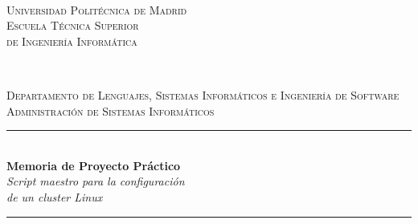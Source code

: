 \documentclass[12pt,a4paper, spanish]{article}
\begin{document}
\begin{titlepage}
  \newcommand{\HRule}{\rule{\linewidth}{0.5mm}}
  \centering

  \textsc{}\\[0.25cm]

  \textsc{\huge{Universidad Politécnica de Madrid}}\\[0.5cm]

  \textsc{\LARGE Escuela Técnica Superior\\de Ingeniería Informática}\\[0.3cm]

  \begin{figure}[H]
    \centering
    \qquad
    \\[0.5cm]
  \end{figure}

  \textsc{\Large Departamento de Lenguajes, Sistemas Informáticos e Ingeniería de Software}\\[0.25cm]

  \textsc{\large Administración de Sistemas Informáticos}\\[0.25cm]

  \HRule\\[0.4cm]

  {\huge\textbf{Memoria de Proyecto Práctico}\\[0.4cm] \textit{Script maestro para la configuración\\de un cluster Linux}}\\[0.4cm]
  \HRule\\[1.25cm]


\end{titlepage}
\end{document}
